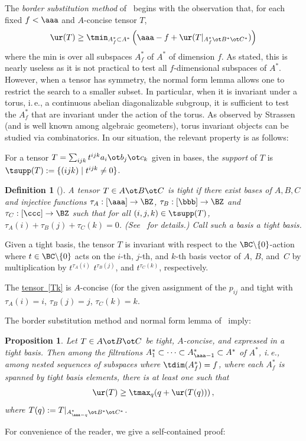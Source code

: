 \documentclass[11pt]{article}
\newcommand{\expeqref}[2]{\texorpdfstring{\hyperref[#2]{#1~\eqref{#2}}}{#1~\eqref{#2}}}
\newtheorem{proposition}[theorem]{Proposition}
\newtheorem{definition}[theorem]{Definition}
\newcommand{\ie}{i.\,e.}
\begin{document}
The \emph{border substitution method} of~\cite{MR3633766} begins with the observation that, for each fixed $f<\aaa$ and $A$-concise tensor $T$,
\begin{equation}\label{submeth}
\ur(T)\geq \tmin_{A^*_f\subset A^*}\left(\aaa-f+\ur(T|_{A^*_f\ot B^*\ot C^*})\right)
\end{equation}
where the min is over all subspaces $A^*_f$ of $A^*$ of  dimension $f$.   
As stated, this is nearly useless as it is not practical to test all $f$-dimensional subspaces of $A^*$.
However, when a tensor has symmetry, the normal form lemma \cite[Lem. 3.1]{MR3633766} allows one
to restrict the search to a smaller subset. In particular, when it is invariant under a torus,
\ie, a continuous
abelian diagonalizable subgroup, it is sufficient to test the $A^*_f$ that are invariant under the action of the torus.
As observed by Strassen (and is well known among algebraic geometers), torus invariant objects
can be studied via combinatorics. In our situation, the relevant property is as follows:

For a tensor $T=\sum_{ijk}t^{ijk} a_i\ot b_j\ot c_k$ given in bases, the \emph{support} of $T$
is $\tsupp(T):=\{ (ijk)\mid t^{ijk}\neq 0\}$.

\begin{definition}[\cite{MR1089800}]   %
A tensor $T\in A\ot B\ot C$ is \emph{tight} 
%
%
%
if there exist bases of $A,B,C$  and  
injective functions $\tau_A : [\aaa] \to \BZ$, $\tau_B : [\bbb] \to \BZ$ and $\tau_C : [\ccc] \to \BZ$ such that
for all $(i,j,k) \in \tsupp(T)$, $\tau_A(i) + \tau_B(j) + \tau_C(k)=0$. (See~\cite{MR4204580}  for details.)
 Call such a basis a \emph{tight basis}.
\end{definition}

Given a tight basis, %
%
the tensor $T$ is invariant with respect to the $\BC\backslash\{ 0\}$-action
where $t\in \BC\backslash\{ 0\}$ acts on
%
%
%
%
%
the $i$-th, $j$-th, and $k$-th
basis vector of $A$, $B$, and~$C$ by multiplication by  $t^{\tau_A(i)}$
$t^{\tau_B(j)}$, and $t^{\tau_C(k)}$, respectively.


The \expeqref{tensor}{Tk}  %
is $A$-concise (for the given assignment of %
the $p_{ij}$  %
and tight with $\tau_A(i)=i$, $\tau_B(j)=j$, $\tau_C(k)=k$.

The border substitution method and normal form lemma of~\cite{MR3633766} imply:
\begin{proposition}\label{tightbapolarok}
Let $T\in A\ot B\ot C$ be tight,  $A$-concise, and expressed in a tight basis. Then among the filtrations $A_1^*\subset \cdots \subset A_{\aaa-1}^*\subset A^*$
of $A^*$,  \ie, among nested sequences of subspaces where $\tdim(A_f^*)=f$, 
where each $A^*_f$ is spanned by tight basis elements, there is at least one such that
$$
\ur(T)\geq \tmax_q(q+\ur(T(q)))\,,
$$
where $T(q):=T|_{A_{\aaa-q}^*\ot B^*\ot C^*}$.
\end{proposition}
For convenience of the reader, we give a self-contained proof:
\end{document}
